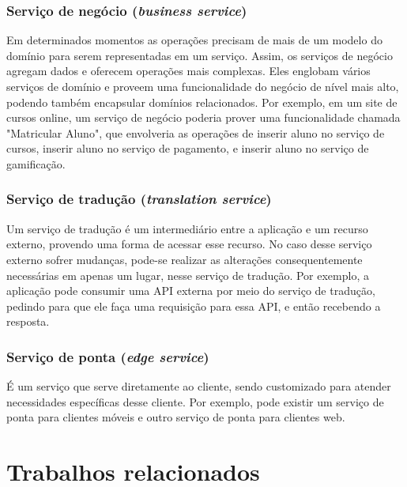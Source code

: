 \subsubsection{Serviço de negócio (\emph{business service})}
Em determinados momentos as operações precisam de mais de um modelo do domínio para serem representadas em um serviço. Assim, os serviços de negócio agregam dados e oferecem operações mais complexas. Eles englobam vários serviços de domínio e proveem uma funcionalidade do negócio de nível mais alto, podendo também encapsular domínios relacionados. Por exemplo, em um site de cursos online, um serviço de negócio poderia prover uma funcionalidade chamada "Matricular Aluno", que envolveria as operações de inserir aluno no serviço de cursos, inserir aluno no serviço de pagamento, e inserir aluno no serviço de gamificação.

\subsubsection{Serviço de tradução (\emph{translation service})}
Um serviço de tradução é um intermediário entre a aplicação e um recurso externo, provendo uma forma de acessar esse recurso. No caso desse serviço externo sofrer mudanças, pode-se realizar as alterações consequentemente necessárias em apenas um lugar, nesse serviço de tradução. Por exemplo, a aplicação pode consumir uma API externa por meio do serviço de tradução, pedindo para que ele faça uma requisição para essa API, e então recebendo a resposta. %

\subsubsection{Serviço de ponta (\emph{edge service})}
É um serviço que serve diretamente ao cliente, sendo customizado para atender necessidades específicas desse cliente. Por exemplo, pode existir um serviço de ponta para clientes móveis e outro serviço de ponta para clientes web.

\section{Trabalhos relacionados}


